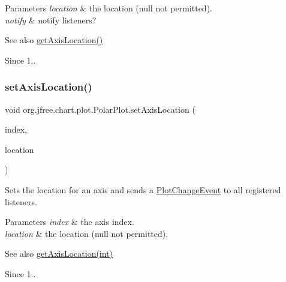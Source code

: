 \begin{DoxyParams}{Parameters}
{\em location} & the location ({\ttfamily null} not permitted). \\
\hline
{\em notify} & notify listeners?\\
\hline
\end{DoxyParams}
\begin{DoxySeeAlso}{See also}
\mbox{\hyperlink{classorg_1_1jfree_1_1chart_1_1plot_1_1_polar_plot_aa5bf9d06a22374312897b364d41dd339}{get\+Axis\+Location()}}
\end{DoxySeeAlso}
\begin{DoxySince}{Since}
1.. 
\end{DoxySince}
\mbox{\label{classorg_1_1jfree_1_1chart_1_1plot_1_1_polar_plot_aa546acbfeb18c870e59eea53057ac79b}} 
\subsubsection{\texorpdfstring{set\+Axis\+Location()}{setAxisLocation()}\hspace{0.1cm}{\footnotesize\ttfamily [3/4]}}
{\footnotesize\ttfamily void org.\+jfree.\+chart.\+plot.\+Polar\+Plot.\+set\+Axis\+Location (\begin{DoxyParamCaption}\item[{int}]{index,  }\item[{\mbox{\hyperlink{classorg_1_1jfree_1_1chart_1_1plot_1_1_polar_axis_location}{Polar\+Axis\+Location}}}]{location }\end{DoxyParamCaption})}

Sets the location for an axis and sends a \mbox{\hyperlink{}{Plot\+Change\+Event}} to all registered listeners.


\begin{DoxyParams}{Parameters}
{\em index} & the axis index. \\
\hline
{\em location} & the location ({\ttfamily null} not permitted).\\
\hline
\end{DoxyParams}
\begin{DoxySeeAlso}{See also}
\mbox{\hyperlink{classorg_1_1jfree_1_1chart_1_1plot_1_1_polar_plot_ae5d05ba6ea1035092f706a79bf21ef1c}{get\+Axis\+Location(int)}}
\end{DoxySeeAlso}
\begin{DoxySince}{Since}
1.. 
\end{DoxySince}
\mbox{\label{classorg_1_1jfree_1_1chart_1_1plot_1_1_polar_plot_aac709edba3221df6fe1154c0db6d1d69}} 
